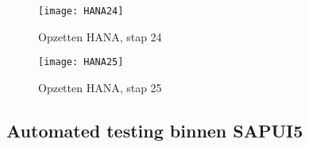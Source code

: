             \begin{figure}	
                \centering
                \texttt{[image: HANA24]}
                \caption{Opzetten HANA, stap 24} \label{HANA24}
            \end{figure}
            
            \begin{figure}	
                \centering
                \texttt{[image: HANA25]}
                \caption{Opzetten HANA, stap 25} \label{HANA25}
            \end{figure} 
            
        \subsection{Automated testing binnen SAPUI5}
        \label{subsec:automated-testing-SAPUI5}
